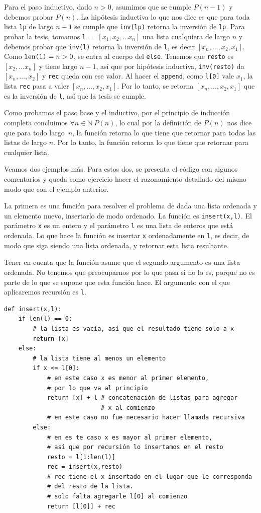 \documentclass[a4paper, 12pt]{report}
\newcommand{\N}{\mathbb{N}}
\newcommand{\te}{\text}
\theoremstyle{definition}
\begin{document}
Para el paso inductivo, dado $n>0$, asumimos que se cumple $P(n-1)$ y debemos probar $P(n)$. La hipótesis inductiva lo que nos dice es que para toda lista {\tt lp} de largo $n-1$ se cumple que {\tt inv(lp)} retorna la inversión de {\tt lp}. Para probar la tesis, tomamos {\tt l} $=[x_1,x_2,\dots x_n]$ una lista cualquiera de largo $n$ y debemos probar que {\tt inv(l)} retorna la inversión de {\tt l}, es decir $[x_n,\dots,x_2,x_1]$. Como $\te{{\tt len(l)}}=n>0$, se entra al cuerpo del {\tt else}. Tenemos que  {\tt resto} es $[x_2,\dots x_n]$ y tiene largo $n-1$, así que por hipótesis inductiva, {\tt inv(resto)} da $[x_n,\dots,x_2]$ y {\tt rec} queda con ese valor. Al hacer el {\tt append}, como {\tt l[0]} vale $x_1$, la lista {\tt rec} pasa a valer $[x_n,\dots,x_2,x_1]$. Por lo tanto, se retorna $[x_n,\dots,x_2,x_1]$ que es la inversión de {\tt l}, así que la tesis se cumple.

Como probamos el paso base y el inductivo, por el principio de inducción completa concluimos $\forall n\in\N~P(n)$, lo cual por la definición de $P(n)$ nos dice que para todo largo~$n$, la función retorna lo que tiene que retornar para todas las listas de largo $n$. Por lo tanto, la función retorna lo que tiene que retornar para cualquier lista.

\vspace{0.5em}
Veamos dos ejemplos más. Para estos dos, se presenta el código con algunos comentarios y queda como ejercicio hacer el razonamiento detallado del mismo modo que con el ejemplo anterior.

La primera es una función para resolver el problema de dada una lista ordenada y un elemento nuevo, insertarlo de modo ordenado. La función es {\tt insert(x,l)}. El parámetro {\tt x} es un entero y el parámetro {\tt l} es una lista de enteros que está ordenada. Lo que hace la función es insertar {\tt x} ordenadamente en {\tt l}, es decir, de modo que siga siendo una lista ordenada, y retornar esta lista resultante.

Tener en cuenta que la función asume que el segundo argumento es una lista ordenada. No tenemos que preocuparnos por lo que pasa si no lo es, porque no es parte de lo que se supone que esta función hace.
El argumento con el que aplicaremos recursión es {\tt l}.
\begin{verbatim}
def insert(x,l):
    if len(l) == 0:
        # la lista es vacía, así que el resultado tiene solo a x
        return [x]
    else:
        # la lista tiene al menos un elemento
        if x <= l[0]:
            # en este caso x es menor al primer elemento,
            # por lo que va al principio
            return [x] + l # concatenación de listas para agregar
                           # x al comienzo
            # en este caso no fue necesario hacer llamada recursiva
        else:
            # en es te caso x es mayor al primer elemento,
            # así que por recursión lo insertamos en el resto
            resto = l[1:len(l)]
            rec = insert(x,resto)
            # rec tiene el x insertado en el lugar que le corresponda
            # del resto de la lista.
            # solo falta agregarle l[0] al comienzo
            return [l[0]] + rec
\end{verbatim}
\end{document}
